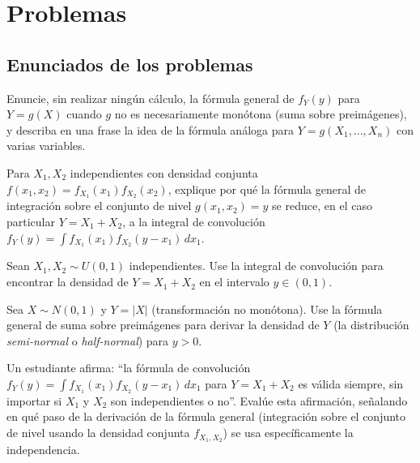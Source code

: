\section*{Problemas}

\subsection*{Enunciados de los problemas}

\begin{problema}
	\label{prob:0b1575d}
	Enuncie, sin realizar ningún cálculo, la fórmula general de $f_Y(y)$ para $Y=g(X)$ cuando $g$ no es necesariamente monótona (suma sobre preimágenes), y describa en una frase la idea de la fórmula análoga para $Y=g(X_1,\ldots,X_n)$ con varias variables.
\end{problema}

\begin{problema}
	\label{prob:a8b056e}
	Para $X_1,X_2$ independientes con densidad conjunta $f(x_1,x_2)=f_{X_1}(x_1)f_{X_2}(x_2)$, explique por qué la fórmula general de integración sobre el conjunto de nivel $g(x_1,x_2)=y$ se reduce, en el caso particular $Y=X_1+X_2$, a la integral de convolución $f_Y(y)=\int f_{X_1}(x_1)f_{X_2}(y-x_1)\,dx_1$.
\end{problema}

\begin{problema}
	\label{prob:4cdd21e}
	Sean $X_1,X_2 \sim U(0,1)$ independientes. Use la integral de convolución para encontrar la densidad de $Y=X_1+X_2$ en el intervalo $y\in(0,1)$.
\end{problema}

\begin{problema}
	\label{prob:43a7344}
	Sea $X\sim N(0,1)$ y $Y=|X|$ (transformación no monótona). Use la fórmula general de suma sobre preimágenes para derivar la densidad de $Y$ (la distribución \emph{semi-normal} o \emph{half-normal}) para $y>0$.
\end{problema}

\begin{problema}
	\label{prob:df21aa1}
	Un estudiante afirma: ``la fórmula de convolución $f_Y(y)=\int f_{X_1}(x_1)f_{X_2}(y-x_1)\,dx_1$ para $Y=X_1+X_2$ es válida siempre, sin importar si $X_1$ y $X_2$ son independientes o no''. Evalúe esta afirmación, señalando en qué paso de la derivación de la fórmula general (integración sobre el conjunto de nivel usando la densidad conjunta $f_{X_1,X_2}$) se usa específicamente la independencia.
\end{problema}

